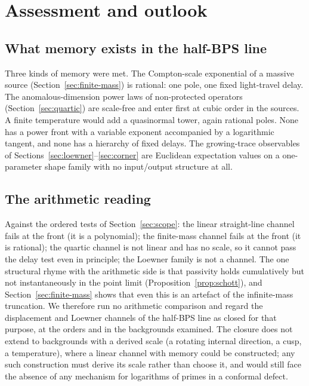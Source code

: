 \section{Assessment and outlook}
\label{sec:outlook}

\subsection{What memory exists in the half-BPS line}

Three kinds of memory were met. The Compton-scale exponential of a massive source (Section~\ref{sec:finite-mass})
is rational: one pole, one fixed light-travel delay. The anomalous-dimension power laws of non-protected operators
(Section~\ref{sec:quartic}) are scale-free and enter first at cubic order in the sources. A finite temperature would
add a quasinormal tower, again rational poles. None has a power front with a variable exponent accompanied by a
logarithmic tangent, and none has a hierarchy of fixed delays. The growing-trace observables of
Sections~\ref{sec:loewner}--\ref{sec:corner} are Euclidean expectation values on a one-parameter shape family with
no input/output structure at all.

\subsection{The arithmetic reading}

Against the ordered tests of Section~\ref{sec:scope}: the linear straight-line channel fails at the front (it is a
polynomial); the finite-mass channel fails at the front (it is rational); the quartic channel is not linear and has no
scale, so it cannot pass the delay test even in principle; the Loewner family is not a channel. The one structural
rhyme with the arithmetic side is that passivity holds cumulatively but not instantaneously in the point limit
(Proposition~\ref{prop:schott}), and Section~\ref{sec:finite-mass} shows that even this is an artefact of the
infinite-mass truncation. We therefore run no arithmetic comparison and regard the displacement and Loewner
channels of the half-BPS line as closed for that purpose, at the orders and in the backgrounds examined. The
closure does not extend to backgrounds with a derived scale (a rotating internal direction, a cusp, a temperature),
where a linear channel with memory could be constructed; any such construction must derive its scale rather than
choose it, and would still face the absence of any mechanism for logarithms of primes in a conformal defect.

